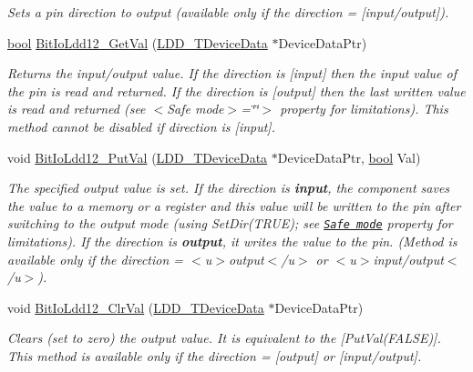 \begin{DoxyCompactItemize}
\begin{DoxyCompactList}\small\item\em Sets a pin direction to output (available only if the direction = {\itshape \mbox{[}input/output\mbox{]}}). \end{DoxyCompactList}\item 
\hyperlink{group___p_e___types__module_ga97a80ca1602ebf2303258971a2c938e2}{bool} \hyperlink{group___bit_io_ldd12__module_gab808ab6ca05818b3bfaba89eee1397b0}{Bit\+Io\+Ldd12\+\_\+\+Get\+Val} (\hyperlink{group___p_e___types__module_gac5cf1362f1f0e3a2ce71b1bf2276d091}{L\+D\+D\+\_\+\+T\+Device\+Data} $\ast$Device\+Data\+Ptr)
\begin{DoxyCompactList}\small\item\em Returns the input/output value. If the direction is \mbox{[}input\mbox{]} then the input value of the pin is read and returned. If the direction is \mbox{[}output\mbox{]} then the last written value is read and returned (see $<$\+Safe mode$>$=\char`\"{}\char`\"{}$>$ property for limitations). This method cannot be disabled if direction is \mbox{[}input\mbox{]}. \end{DoxyCompactList}\item 
void \hyperlink{group___bit_io_ldd12__module_ga9db76c4359c6a7420209b0a4c6c4b940}{Bit\+Io\+Ldd12\+\_\+\+Put\+Val} (\hyperlink{group___p_e___types__module_gac5cf1362f1f0e3a2ce71b1bf2276d091}{L\+D\+D\+\_\+\+T\+Device\+Data} $\ast$Device\+Data\+Ptr, \hyperlink{group___p_e___types__module_ga97a80ca1602ebf2303258971a2c938e2}{bool} Val)
\begin{DoxyCompactList}\small\item\em The specified output value is set. If the direction is {\bfseries  input}, the component saves the value to a memory or a register and this value will be written to the pin after switching to the output mode (using {\ttfamily Set\+Dir(\+T\+R\+U\+E)}; see \href{BitIOProperties.html#SafeMode}{\tt Safe mode} property for limitations). If the direction is {\bfseries output}, it writes the value to the pin. (Method is available only if the direction = $<$u$>${\ttfamily output}$<$/u$>$ or $<$u$>${\ttfamily  input/output}$<$/u$>$). \end{DoxyCompactList}\item 
void \hyperlink{group___bit_io_ldd12__module_ga8a874582bd5c8203b3dfb47ea504ae12}{Bit\+Io\+Ldd12\+\_\+\+Clr\+Val} (\hyperlink{group___p_e___types__module_gac5cf1362f1f0e3a2ce71b1bf2276d091}{L\+D\+D\+\_\+\+T\+Device\+Data} $\ast$Device\+Data\+Ptr)
\begin{DoxyCompactList}\small\item\em Clears (set to zero) the output value. It is equivalent to the \mbox{[}Put\+Val(\+F\+A\+L\+S\+E)\mbox{]}. This method is available only if the direction = {\itshape \mbox{[}output\mbox{]}} or {\itshape \mbox{[}input/output\mbox{]}}. \end{DoxyCompactList}\item 

\end{DoxyCompactItemize}
